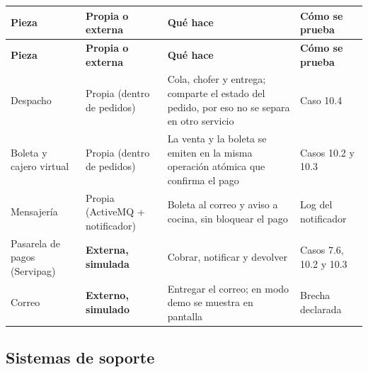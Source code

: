 {\small
\setlength{\tabcolsep}{3pt}\renewcommand{\arraystretch}{1.15}
\begin{longtable}{|>{\raggedright\arraybackslash}p{}|>{\raggedright\arraybackslash}p{}|>{\raggedright\arraybackslash}p{}|>{\raggedright\arraybackslash}p{}|}
\hline
\textbf{Pieza} & \textbf{Propia o externa} & \textbf{Qué hace} & \textbf{Cómo se prueba} \\ \hline
\endfirsthead
\hline
\textbf{Pieza} & \textbf{Propia o externa} & \textbf{Qué hace} & \textbf{Cómo se prueba} \\ \hline
\endhead
Despacho & Propia (dentro de pedidos) & Cola, chofer y entrega; comparte el estado del pedido, por eso no se separa en otro servicio & Caso 10.4 \\ \hline
Boleta y cajero virtual & Propia (dentro de pedidos) & La venta y la boleta se emiten en la misma operación atómica que confirma el pago & Casos 10.2 y 10.3 \\ \hline
Mensajería & Propia (ActiveMQ + notificador) & Boleta al correo y aviso a cocina, sin bloquear el pago & Log del notificador \\ \hline
Pasarela de pagos (Servipag) & \textbf{Externa, simulada} & Cobrar, notificar y devolver & Casos 7.6, 10.2 y 10.3 \\ \hline
Correo & \textbf{Externo, simulado} & Entregar el correo; en modo demo se muestra en pantalla & Brecha declarada \\ \hline
\end{longtable}
}

\subsection{Sistemas de soporte}


